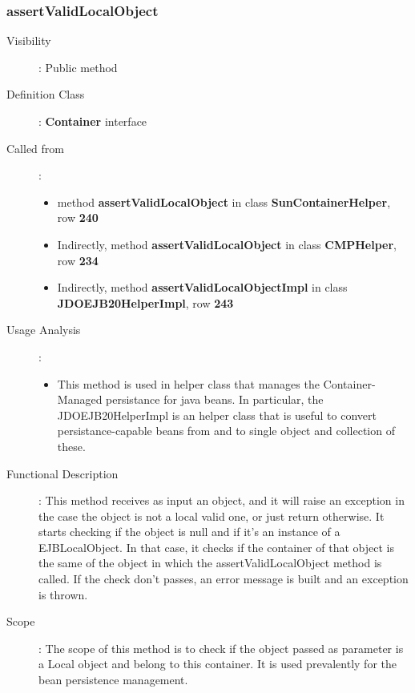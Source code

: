\documentclass[11pt, a4paper,titlepage]{article}
\begin{document}
	 \subsubsection{assertValidLocalObject}
	 \begin{description}
	 	\item[Visibility]: Public method
	 	\item[Definition Class]: \textbf{Container} interface
	 	\item[Called from]: 
	 	\begin{itemize}
	 		\item method \textbf{assertValidLocalObject} in class \textbf{SunContainerHelper}, row \textbf{240}
	 		\item Indirectly, method \textbf{assertValidLocalObject} in class \textbf{CMPHelper}, row \textbf{234}
	 		
	 		\item Indirectly, method \textbf{assertValidLocalObjectImpl} in class \textbf{JDOEJB20HelperImpl}, row \textbf{243}
	 	\end{itemize}
	 	\item[Usage Analysis]: 
	 	\begin{itemize}
	 		\item This method is used in helper class that manages the Container-Managed persistance for java beans. \newline In particular, the JDOEJB20HelperImpl is an helper class that is useful to convert persistance-capable beans from and to single object and collection of these.
	 		
	 	\end{itemize} 
	 	\item[Functional Description]: This method receives as input an object, and it will raise an exception in the case the object is not a local valid one, or just return otherwise. It starts checking if the object is null and if it's an instance of a EJBLocalObject. In that case, it checks if the container of that object is the same of the object in which the assertValidLocalObject method is called. If the check don't passes, an error message is built and an exception is thrown.
	 	\item[Scope]: The scope of this method is to check if the object passed as parameter is a Local object and belong to this container. It is used prevalently for the bean persistence management.  
	 \end{description}
\newpage
\end{document}
